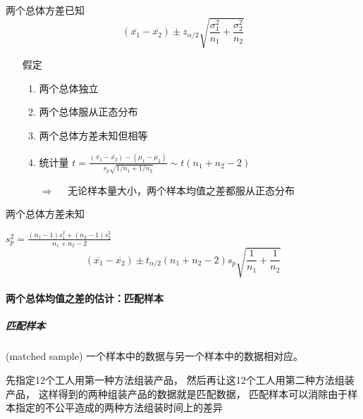 \documentclass[UTF8,10pt]{book}
\begin{document}
                        {\kaishu 两个总体方差已知}
                        $$\left( \overline{x_1}-\overline{x_2} \right)  \pm z_{\alpha/2} \sqrt{  \frac{\sigma_1^2}{n_1} + \frac{\sigma_2^2}{n_2}   }$$

                        \begin{itemize}
                            \item [假定]{
                            \begin{enumerate}
                                \item 两个总体独立
                                \item 两个总体服从正态分布
                                \item 两个总体方差未知但相等
                                \item 统计量 $ t = \frac{\left( \overline{x_1}-\overline{x_2} \right)  - \left(\mu_1-\mu_2\right)}{s_p \sqrt{  1/{n_1} + 1/{n_2} }} \sim t(n_1+n_2-2)$
                            
                                $\Rightarrow \quad $ 无论样本量大小，两个样本均值之差都服从正态分布
                            \end{enumerate}
                            }
                        \end{itemize}

                       
                        {\kaishu 两个总体方差未知}

                        $s_p^2 = \frac{ \left(n_1-1\right)s_1^2  +\left(n_2-1\right)s_2^2  }{n_1+n_2-2}$
                            $$\left( \overline{x_1}-\overline{x_2} \right)  \pm t_{\alpha/2} \left(n_1+n_2 - 2\right) s_p \sqrt{ \frac{1}{n_1} + \frac{1}{n_2}   }$$

                
                \paragraph{两个总体均值之差的估计：匹配样本}
                        
                        \subparagraph{匹配样本} (matched sample) 一个样本中的数据与另一个样本中的数据相对应。

                        {\kaishu 先指定12个工人用第一种方法组装产品，
                        然后再让这12个工人用第二种方法组装产品，
                        这样得到的两种组装产品的数据就是匹配数据，
                        匹配样本可以消除由于样本指定的不公平造成的两种方法组装时间上的差异}
\end{document}
